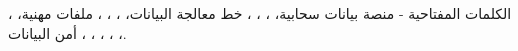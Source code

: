 \vspace{0.12cm}
\noindent\colorbox{lightpanel}{%
  \parbox{\dimexpr\linewidth-2\fboxsep\relax}{%
\begin{arabtext}
الكلمات المفتاحية - منصة بيانات سحابية، ، ، ، خط معالجة البيانات، ، ، ، ملفات مهنية، ، ، ، ، ، ، أمن البيانات.
\end{arabtext}
  }%
}
\normalsize

\clearpage
